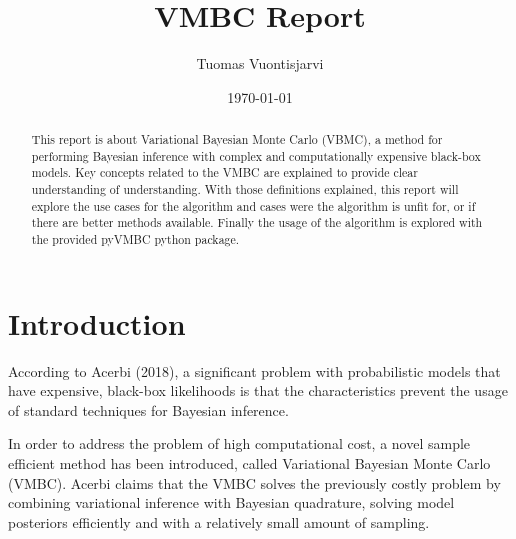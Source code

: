 \documentclass[english,oneside,openany]{UH_DS_report}
\title{VMBC Report}
\author{Tuomas Vuontisjarvi}
\date{\today}
\begin{document}
\maketitle


\begin{abstract}
This report is about Variational Bayesian Monte Carlo (VBMC), a method for performing 
Bayesian inference with complex and computationally expensive black-box models. Key concepts
related to the VMBC are explained to provide clear understanding of understanding. With those 
definitions explained, this report will explore the use cases for the algorithm and cases
were the algorithm is unfit for, or if there are better methods available. Finally the usage
of the algorithm is explored with the provided pyVMBC python package.
\end{abstract}

\mytableofcontents

\mynomenclature


\chapter{Introduction}
\label{chapter:intro}

According to Acerbi (2018), a significant problem with probabilistic models that have expensive,
black-box likelihoods is that the characteristics prevent the usage of standard techniques for 
Bayesian inference.

In order to address the problem of high computational cost, a novel sample efficient method 
has been introduced, called Variational Bayesian Monte Carlo (VMBC). 
Acerbi \cite{acerbi2018} claims that the VMBC solves the previously costly problem by combining 
variational inference with Bayesian quadrature, solving model posteriors efficiently 
and with a relatively small amount of sampling.
\end{document}
